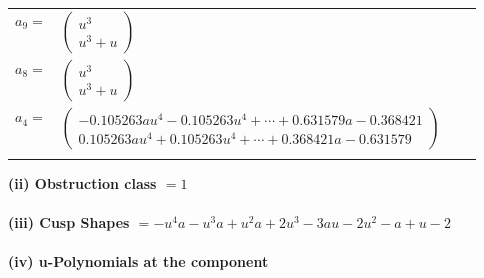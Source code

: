 \documentclass[1p]{elsarticle_modified}
\theoremstyle{definition}
\begin{document}
\begin{tabular}{m{7pt} m{180pt} m{7pt} m{180pt} }
\flushright $a_{9}=$&$\begin{pmatrix}u^3\\u^3+u\end{pmatrix}$ \\
\flushright $a_{8}=$&$\begin{pmatrix}u^3\\u^3+u\end{pmatrix}$ \\
\flushright $a_{4}=$&$\begin{pmatrix}-0.105263 a u^{4}-0.105263 u^{4}+\cdots+0.631579 a-0.368421\\0.105263 a u^{4}+0.105263 u^{4}+\cdots+0.368421 a-0.631579\end{pmatrix}$\\&\end{tabular}
\flushleft \textbf{(ii) Obstruction class $= 1$}\\~\\
\flushleft \textbf{(iii) Cusp Shapes $= - u^4 a- u^3 a+u^2 a+2 u^3-3 a u-2 u^2- a+u-2$}\\~\\
\newpage\renewcommand{\arraystretch}{1}
\flushleft \textbf{(iv) u-Polynomials at the component}\newline \\
\end{document}
